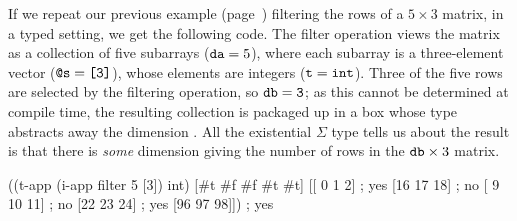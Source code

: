 If we repeat our previous example
(page~\pageref{example:matrix-filter})
filtering the rows of a $5 \times 3$ matrix, in a typed setting,
we get the following code.
The filter operation views the matrix
as a collection of five subarrays ($\ex{da} = 5$),
where each subarray is a three-element vector ($\ex{@s} = \ex{[3]}$),
whose elements are integers ($\ex{t} = \ex{int}$).
Three of the five rows are selected by the filtering operation,
so $\ex{db} = \ex{3}$;
as this cannot be determined at compile time,
the resulting collection is packaged up in a box whose type abstracts away
the dimension .
All the existential $\Sigma$ type tells us about the result is
that there is \emph{some} dimension  giving the number of
rows in the $\ex{db} \times 3$ matrix.
\begin{code}
    ((t-app (i-app filter 5 [3]) int)
     [#t #f #f #t #t]
     [[ 0  1  2]    ; yes      
      [16 17 18]    ; no
      [ 9 10 11]    ; no
      [22 23 24]    ; yes
      [96 97 98]])  ; yes

\end{code}


